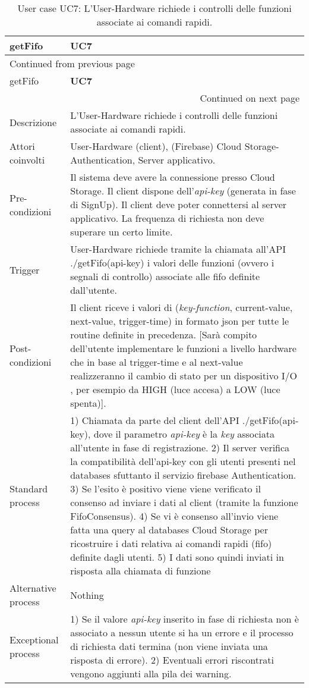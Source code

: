 \documentclass[onecolumn,a4paper]{article}
\begin{document}
\begin{longtable}{|l|p{9.7cm}|}
\caption{User case UC7: L'User-Hardware richiede i controlli delle funzioni associate ai comandi rapidi.}
\\
\cellcolor{grey!15}getFifo & \cellcolor{grey!15} \textbf{UC7}\\
\hline
\endfirsthead
\multicolumn{2}{l}{Continued from previous page} \\
\hline

\cellcolor{grey!15}getFifo & \cellcolor{grey!15} \textbf{UC7} \\

\hline
\endhead
\hline\multicolumn{2}{r}{Continued on next page} \\
\endfoot
\endlastfoot
\hline
Descrizione & L'User-Hardware richiede i controlli delle funzioni associate ai comandi rapidi.\\
\hline
Attori coinvolti & User-Hardware (client), (Firebase) Cloud Storage-Authentication, Server applicativo.\\
\hline
Pre-condizioni & Il sistema deve avere la connessione presso Cloud Storage. Il client dispone dell'\emph{api-key} (generata in fase di SignUp). Il client deve poter connettersi al server applicativo. La frequenza di richiesta non deve superare un certo limite.\\
\hline
Trigger & User-Hardware richiede tramite la chiamata all'API ./getFifo(api-key) i valori delle funzioni (ovvero i segnali di controllo) associate alle fifo definite dall'utente.\\
\hline
Post-condizioni & Il client riceve i valori di (\emph{key-function}, current-value, next-value, trigger-time) in formato json per tutte le routine definite in precedenza. [Sarà compito dell'utente implementare le funzioni a livello hardware che in base al trigger-time e al next-value realizzeranno il cambio di stato per un dispositivo I/O , per esempio da HIGH (luce accesa) a LOW (luce spenta)].\\
\hline
Standard process & 1) Chiamata da parte del client dell'API ./getFifo(api-key), dove il parametro \emph{api-key} è la \emph{key} associata all'utente in fase di registrazione. 2) Il server verifica la compatibilità dell'api-key con gli utenti presenti nel databases sfuttanto il servizio firebase Authentication. 3) Se l'esito è positivo viene viene verificato il consenso ad inviare i dati al client (tramite la funzione FifoConsensus). 4) Se vi è consenso all'invio viene fatta una query al databases Cloud Storage per ricostruire i dati relativa ai comandi rapidi (fifo) definite dagli utenti. 5) I dati sono quindi inviati in risposta alla chiamata di funzione\\
\hline
Alternative process & Nothing\\
\hline
Exceptional process & 1) Se il valore \emph{api-key} inserito in fase di richiesta non è associato a nessun utente si ha un errore e il processo di richiesta dati termina (non viene inviata una risposta di errore). 2) Eventuali errori riscontrati vengono aggiunti alla pila dei warning.\\
\hline
\end{longtable}
\end{document}
